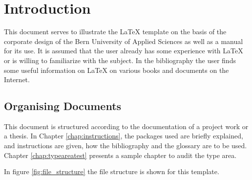 \chapter{Introduction}
\label{chap:introduction}

This document serves to illustrate the \LaTeX{} template on the basis of the corporate design of the Bern University of Applied Sciences as well as a manual for its use. It is assumed that the user already has some experience with \LaTeX{} or is willing to familiarize with the subject. In the bibliography the user finds some useful information on \LaTeX{} on various books and documents on the Internet.

\nocite{kopka:band1}
\nocite{raichle:bibtex_programmierung}
\nocite{MiKTeX}
\nocite{KOMA}
\nocite{TeXnicCenter}
\nocite{Marti06}
\nocite{Erbsland08}
\nocite{juergens:einfuehrung}
\nocite{juergens:fortgeschritten}

\section{Organising Documents}
\label{sec:einleitung_aufbau}

This document is structured according to the documentation of a project work or a thesis. In Chapter \ref{chap:instructions}, the packages used are briefly explained, and instructions are given, how the bibliography and the glossary are to be used. Chapter \ref{chap:typeareatest} presents a sample chapter to audit the type area.

In figure \ref{fig:file_structure} the file structure is shown for this template.

